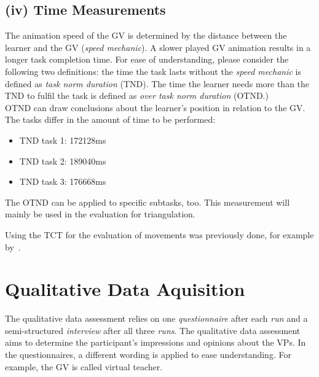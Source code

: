 \subsection{(iv) Time Measurements}
The animation speed of the GV is determined by the distance between the learner and the GV (\textit{speed mechanic}). A slower played GV animation results in a longer task completion time. For ease of understanding, please consider the following two definitions: the time the task lasts without the \textit{speed mechanic} is defined as \textit{task norm duration} (TND). The time the learner needs more than the TND to fulfil the task is defined as \textit{over task norm duration} (OTND.)\\
OTND can draw conclusions about the learner's position in relation to the GV.
The tasks differ in the amount of time to be performed:
\begin{itemize}
	\item TND task 1: 172128ms
	\item TND task 2: 189040ms
	\item TND task 3: 176668ms
\end{itemize}
The OTND can be applied to specific subtasks, too. This measurement will mainly be used in the evaluation for triangulation.

Using the TCT for the evaluation of movements was previously done, for example by~\cite{onebody,YouMove,perspectivematters}.

\section{Qualitative Data Aquisition}
\label{sec:quali_logging}
The qualitative data assessment relies on one \textit{questionnaire} after each \textit{run} and a semi-structured \textit{interview} after all three \textit{runs}. The qualitative data assessment aims to determine the participant's impressions and opinions about the VPs. In the questionnaires, a different wording is applied to ease understanding. For example, the GV is called virtual teacher. 

